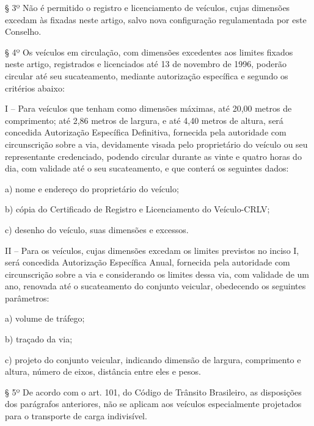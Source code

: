 \begin{anexosenv}
§ 3º Não é permitido o registro e licenciamento de veículos, cujas dimensões excedam às fixadas neste artigo, salvo nova configuração regulamentada por este Conselho.

§ 4º Os veículos em circulação, com dimensões excedentes aos limites fixados neste artigo, registrados e licenciados até 13 de novembro de 1996, poderão circular até seu sucateamento, mediante autorização específica e segundo os critérios abaixo:

I – Para veículos que tenham como dimensões máximas, até 20,00 metros de comprimento; até 2,86 metros de largura, e até 4,40 metros de altura, será concedida Autorização Específica Definitiva, fornecida pela autoridade com circunscrição sobre a via, devidamente visada pelo proprietário do veículo ou seu representante credenciado, podendo circular durante as vinte e quatro horas do dia, com validade até o seu sucateamento, e que conterá os seguintes dados:

a)  nome e endereço do proprietário do veículo;

b) cópia do Certificado de Registro e Licenciamento do Veículo-CRLV;

c) desenho do veículo, suas dimensões e excessos.

II – Para os veículos, cujas dimensões excedam os limites previstos no inciso I, será concedida Autorização Específica Anual, fornecida pela autoridade com circunscrição sobre a via e considerando os limites dessa via, com validade de um ano, renovada até o sucateamento do conjunto veicular, obedecendo os seguintes parâmetros:

a)  volume de tráfego;

b)  traçado da via;

c) projeto do conjunto veicular, indicando dimensão de largura, comprimento e altura, número de eixos, distância entre eles e pesos.

§ 5º De acordo com o art. 101, do Código de Trânsito Brasileiro, as disposições dos parágrafos anteriores, não se aplicam aos veículos especialmente projetados para o transporte de carga indivisível.



\end{anexosenv}
